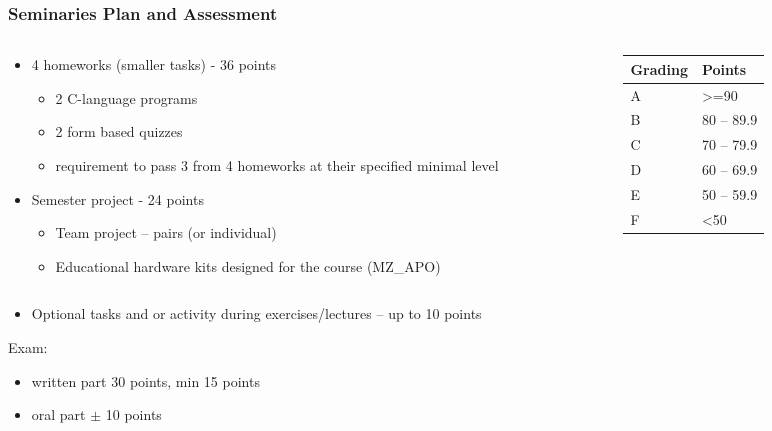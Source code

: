 \documentclass{beamer}
\begin{document}
\begin{frame}
\frametitle{Seminaries Plan and Assessment}

\begin{columns}
\begin{column}{0.6\textwidth}
\begin{itemize}
\item 4 homeworks (smaller tasks) - 36 points
\begin{itemize}
\item 2 C-language programs
\item 2 form based quizzes
\item requirement to pass 3 from 4 homeworks at their specified minimal level
\end{itemize}
\item Semester project - 24 points
\begin{itemize}
\item Team project -- pairs (or individual)
\item Educational hardware kits designed for the course (MZ\_APO)
\end{itemize}
\end{itemize}
\end{column}
\begin{column}{0.35\textwidth}
   \begin{tabular}{|l|l|} \hline
   Grading & Points \\ \hline
   A & >=90 \\ \hline
   B & 80 -- 89.9\\ \hline
   C & 70 -- 79.9\\ \hline
   D & 60 -- 69.9\\ \hline
   E & 50 -- 59.9\\ \hline
   F & <50 \\ \hline
   \end{tabular}
\end{column}
\end{columns}
\begin{itemize}
\item Optional tasks and or activity during exercises/lectures -- up to 10 points
\end{itemize}
\bigskip
Exam:
\begin{itemize}
\item written part 30 points, min 15 points
\item oral part $\pm$ 10 points
\end{itemize}

\end{frame}
\end{document}
